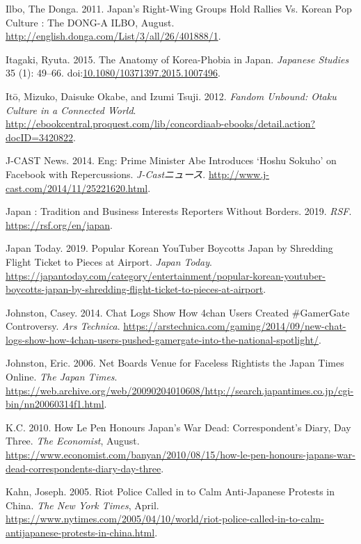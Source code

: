 \documentclass[10pt,british,A4paper,,openany]{memoir}
\begin{document}
\hypertarget{ref-the_donga_ilbo_japans_2011}{}
Ilbo, The Donga. 2011. Japan's Right-Wing Groups Hold Rallies Vs. Korean
Pop Culture : The DONG-A ILBO, August.
\url{http://english.donga.com/List/3/all/26/401888/1}.

\hypertarget{ref-itagaki_anatomy_2015}{}
Itagaki, Ryuta. 2015. The Anatomy of Korea-Phobia in Japan.
\emph{Japanese Studies} 35 (1): 49--66.
doi:\href{https://doi.org/10.1080/10371397.2015.1007496}{10.1080/10371397.2015.1007496}.

\hypertarget{ref-ito_fandom_2012}{}
Itō, Mizuko, Daisuke Okabe, and Izumi Tsuji. 2012. \emph{Fandom Unbound:
Otaku Culture in a Connected World}.
\url{http://ebookcentral.proquest.com/lib/concordiaab-ebooks/detail.action?docID=3420822}.

\hypertarget{ref-j-cast_news_eng:_2014}{}
J-CAST News. 2014. Eng: Prime Minister Abe Introduces `Hoshu Sokuho' on
Facebook with Repercussions. \emph{J-Castニュース}.
\url{http://www.j-cast.com/2014/11/25221620.html}.

\hypertarget{ref-noauthor_japan_2019}{}
Japan : Tradition and Business Interests Reporters Without Borders.
2019. \emph{RSF}. \url{https://rsf.org/en/japan}.

\hypertarget{ref-japan_today_popular_2019}{}
Japan Today. 2019. Popular Korean YouTuber Boycotts Japan by Shredding
Flight Ticket to Pieces at Airport. \emph{Japan Today}.
\url{https://japantoday.com/category/entertainment/popular-korean-youtuber-boycotts-japan-by-shredding-flight-ticket-to-pieces-at-airport}.

\hypertarget{ref-johnston_chat_2014}{}
Johnston, Casey. 2014. Chat Logs Show How 4chan Users Created
\#GamerGate Controversy. \emph{Ars Technica}.
\url{https://arstechnica.com/gaming/2014/09/new-chat-logs-show-how-4chan-users-pushed-gamergate-into-the-national-spotlight/}.

\hypertarget{ref-johnston_net_2006}{}
Johnston, Eric. 2006. Net Boards Venue for Faceless Rightists the Japan
Times Online. \emph{The Japan Times}.
\url{https://web.archive.org/web/20090204010608/http://search.japantimes.co.jp/cgi-bin/nn20060314f1.html}.

\hypertarget{ref-k.c._how_2010}{}
K.C. 2010. How Le Pen Honours Japan's War Dead: Correspondent's Diary,
Day Three. \emph{The Economist}, August.
\url{https://www.economist.com/banyan/2010/08/15/how-le-pen-honours-japans-war-dead-correspondents-diary-day-three}.

\hypertarget{ref-kahn_riot_2005}{}
Kahn, Joseph. 2005. Riot Police Called in to Calm Anti-Japanese Protests
in China. \emph{The New York Times}, April.
\url{https://www.nytimes.com/2005/04/10/world/riot-police-called-in-to-calm-antijapanese-protests-in-china.html}.
\end{document}
